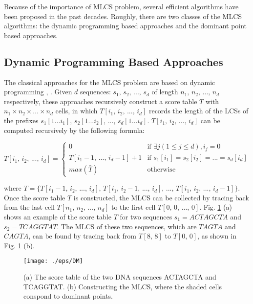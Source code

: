 \documentclass{article}
\begin{document}
Because of the importance of MLCS problem, several efficient
algorithms have been proposed in the past decades. Roughly, there are
two classes of the MLCS algorithms: the dynamic programming based
approaches and the dominant point based approaches.

\subsection{Dynamic Programming Based Approaches}
\label{sec:Dynamic Programming}

The classical approaches for the MLCS problem are based on dynamic
programming \cite{Smith1981}, \cite{Sankoff1972}. Given $d$ sequences:
$s_1,\, s_2,\,...,\, s_d$ of length $n_1,\, n_2,\, ...,\, n_d$
respectively, these approaches recursively construct a score table $T$
with $n_1 \times n_2 \times ... \times n_d$ cells, in which
$T[i_1,\, i_2,\, ...,\, i_d]$ records the length of the LCSs of the
prefixes $s_1[1...i_1]$, $s_2[1...i_2]$, ..., $s_d[1...i_d]$.
$T[i_1,\, i_2,\, ...,\, i_d]$ can be computed recursively by the
following formula:

\begin{equation*}
  T[i_1,\, i_2,\, ...,\, i_d] = 
  \begin{cases}
    0 & \text{if $\exists j(1 \leq j \leq d), i_j = 0$}\\
    T[i_1-1,\, ...,\, i_d-1] + 1  & \text{if $s_1[i_1] = s_2[i_2] =
      ... = s_d[i_d]$}\\
    max(\bar{T}) & \text{otherwise}
  \end{cases}
\end{equation*}

where
$\bar{T} = \{T[i_1-1,\, i_2,\, ...,\, i_d],\, T[i_1,\, i_2-1,\, ...,\,
i_d],\, ...,\, T[i_1,\, i_2,\, ...,\, i_d-1]\}$. Once the score table
$T$ is constructed, the MLCS can be collected by tracing back from the
last cell $T[n_1,\, n_2,\, ...,\, n_d]$ to the first cell
$T[0,\, 0,\, ...,\, 0]$. Fig. \ref{fig:DM} (a) shows an example of the
score table $T$ for two sequences $s_1 = ACTAGCTA$ and
$s_2 = TCAGGTAT$. The MLCS of these two sequences, which are $TAGTA$
and $CAGTA$, can be found by tracing back from $T[8,\, 8]$ to
$T[0,\, 0]$, as shown in Fig. \ref{fig:DM} (b).


\begin{figure}[htbp]
  \centering
  \texttt{[image: ./eps/DM]}
  \caption{(a) The score table of the two DNA sequences ACTAGCTA and
    TCAGGTAT. (b) Constructing the MLCS, where the shaded cells
    conspond to dominant points.}
  \label{fig:DM}
\end{figure}
\end{document}
